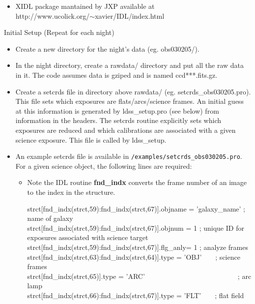 \documentclass[11pt,letterpaper,dvips]{article}
\begin{document}
\begin{enumerate}
\begin{itemize}
	\item XIDL package mantained by JXP available at\\
	http://www.ucolick.org/$\sim$xavier/IDL/index.html
   \end{itemize}

\vskip 0.5cm
{\Large \bf \item Initial Setup (Repeat for each night) }

  \begin{itemize}

    \item Create a new directory for the night's data (eg. obs030205/).

    \item In the night directory, create a rawdata/ directory and put all
    the raw data in it.  The code assumes data is gziped and is named
    ccd***.fits.gz.

    \item Create a setcrds file in directory above rawdata/
      (eg. setcrds\_obs030205.pro).  This file sets which exposures
      are flats/arcs/science frames.  An initial guess at this
      information is generated by ldss\_setup.pro (see below) from
      information in the headers.  The setcrds routine explicitly sets
      which exposures are reduced and which calibrations are
      associated with a given science exposure.  This file is called
      by ldss\_setup.

    \item An example setcrds file is available in
      {\tt /examples/setcrds\_obs030205.pro}.  For a given science object,
      the following lines are required:\\

        \begin{itemize}
	\item Note the IDL routine {\bf fnd\_indx} converts
	the frame number of an image to the index in the structure. 


        strct[fnd\_indx(strct,59):fnd\_indx(strct,67)].objname   = 'galaxy\_name'    ; name of galaxy\\
	strct[fnd\_indx(strct,59):fnd\_indx(strct,67)].objnum  = 1   ; unique ID for exposures associated with science target\\
	strct[fnd\_indx(strct,59):fnd\_indx(strct,67)].flg\_anly= 1   ; analyze frames\\
	strct[fnd\_indx(strct,63):fnd\_indx(strct,64)].type    = 'OBJ'~~~~; science frames\\
	strct[fnd\_indx(strct,65)].type = 'ARC'~~~~~~~~~~~~~~~~~~~~~~~~~~~; arc lamp\\
	strct[fnd\_indx(strct,66):fnd\_indx(strct,67)].type    = 'FLT'~~~~; flat field\\
	

\end{itemize}
\end{itemize}
\end{enumerate}
\end{document}
